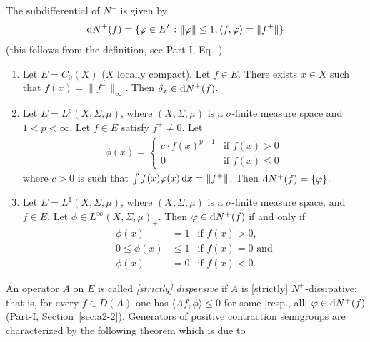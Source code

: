 The subdifferential of\/ $N^{+}$ is given by
\begin{equation}\label{eq:c2-1.2}
	\diff{N^{+}}(f) = \{\phi \in E'_{+} \colon \|\phi\| \leq 1, \langle f,\phi \rangle = \|f^{+}\|\}
\end{equation}
(this follows from the definition, see Part-I, Eq.~).
\begin{examples}\label{ex:c2-1.1}
%
\begin{enumerate}[\upshape (i), wide, labelindent=.25em]  %
\item \label{ex:c2-1.1-1}
Let $E = C_{0}(X)$ ($X$ locally compact). 
Let $f \in E$.
There exists $x \in X$ such that $f(x) = \|f^{+}\|_{\infty}$. 
Then $\delta_{x} \in \mathop{}\!\mathrm{d}{N^{+}}(f)$.
\item \label{ex:c2-1.1-2}
Let $E = L^{p}(X,\Sigma,\mu)$, where $(X,\Sigma,\mu)$ is a $\sigma$-finite measure space and $1 < p < \infty$. Let $f \in E$ satisfy $f^{+} \neq 0$. Let
\begin{align*}
\phi(x) = 
    \begin{cases}
        c \cdot f(x)^{p-1} & \text{if } f(x) > 0 \\
        0 & \text{if } f(x) \leq 0
    \end{cases}
\end{align*}
where $c > 0$ is such that $\int f(x) \phi(x) \dx = \|f^{+}\|$.
Then $\diff{N^{+}}(f) = \{\phi\}$.
\item \label{ex:c2-1.1-3}
Let $E = L^{1}(X,\Sigma,\mu)$, where $(X,\Sigma,\mu)$ is a $\sigma$-finite measure space, and $f \in E$. Let $\phi \in L^{\infty}(X,\Sigma,\mu)_{+}$. Then $\phi \in \diff{N^{+}}(f)$ if and only if
\begin{align*}
\phi(x) &= 1 & \text{if } f(x) > 0, \\
0 \leq \phi(x) &\leq 1 & \text{if } f(x) = 0 \text{ and} \\
\phi(x) &= 0 & \text{if } f(x) < 0.
\end{align*}
\end{enumerate}
\end{examples}
An operator $A$ on $E$ is called \emph{[strictly] dispersive} if\/ $A$ is [strictly] $N^{+}$-dissipative; that is, for every $f \in D(A)$ one has $\langle Af,\phi \rangle \leq 0$ for some [resp., all] $\phi \in \diff{N^{+}}(f)$ (\cf Part-I, Section~\ref{sec:a2-2}). 
Generators of positive contraction semigroups are characterized by the following theorem which is due to 

